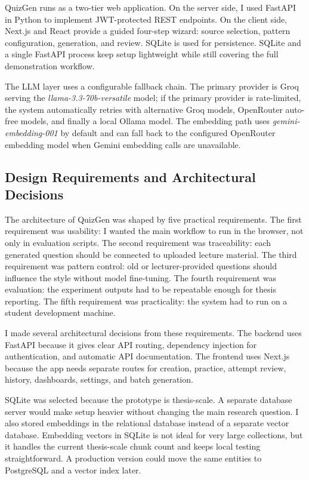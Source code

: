 \documentclass[12pt,a4paper]{article}
\begin{document}
QuizGen runs as a two-tier web application. On the server side, I used
FastAPI in Python to implement JWT-protected REST endpoints. On the client
side, Next.js and React provide a guided four-step wizard: source selection,
pattern configuration, generation, and review. SQLite is used for
persistence. SQLite and a single FastAPI process keep setup lightweight while
still covering the full demonstration workflow.

The LLM layer uses a configurable fallback chain. The primary provider is
Groq serving the \textit{llama-3.3-70b-versatile} model; if the primary
provider is rate-limited, the system automatically retries with alternative
Groq models, OpenRouter auto-free models, and finally a local Ollama model.
The embedding path uses \textit{gemini-embedding-001} by default and can
fall back to the configured OpenRouter embedding model when Gemini embedding
calls are unavailable.

\subsection{Design Requirements and Architectural Decisions}

The architecture of QuizGen was shaped by five practical requirements. The
first requirement was usability: I wanted the main workflow to run in the
browser, not only in evaluation scripts. The second requirement was
traceability: each generated question should be connected to uploaded
lecture material. The third requirement was pattern control: old or
lecturer-provided questions should influence the style without model
fine-tuning. The fourth requirement was evaluation: the experiment outputs
had to be repeatable enough for thesis reporting. The fifth requirement was
practicality: the system had to run on a student development machine.

I made several architectural decisions from these requirements. The backend
uses FastAPI because it gives clear API routing, dependency injection for
authentication, and automatic API documentation. The frontend uses Next.js
because the app needs separate routes for creation, practice, attempt
review, history, dashboards, settings, and batch generation.

SQLite was selected because the prototype is thesis-scale. A separate
database server would make setup heavier without changing the main research
question. I also stored embeddings in the relational database instead of a
separate vector database. Embedding vectors in SQLite is not ideal for very large collections,
but it handles the current thesis-scale chunk count and keeps local testing
straightforward. A production version could move the
same entities to PostgreSQL and a vector index later.
\end{document}
